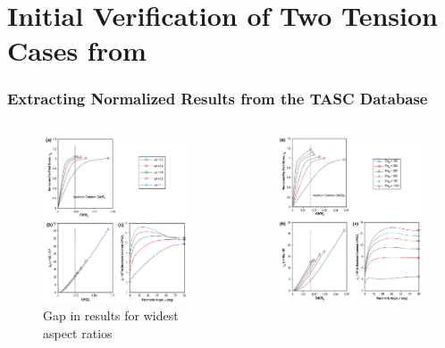 \part{Initial Verification of Two Tension Cases from \citet{allenwells2014}}

\section{Extracting Normalized Results from the TASC Database}

\begin{frame}
\begin{columns}
\begin{column}{0.45\textwidth}
\begin{figure}[tbp]
\centering
\includegraphics[width=0.7\columnwidth]{aspect-ratio-gap}
\caption{\label{fig:aspect-ratio-gap} Gap in results for widest aspect ratios}
\end{figure}
\end{column}
\begin{column}{0.45\textwidth}
\begin{figure}[tbp]
\centering
\includegraphics[width=0.7\columnwidth]{modulus-gap}

\end{figure}
\end{column}
\end{columns}
\end{frame}
